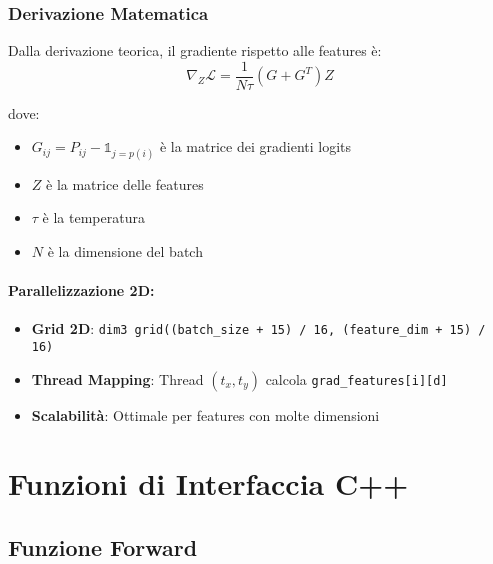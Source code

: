 \documentclass[a4paper,11pt]{article}
\begin{document}
\subsubsection{Derivazione Matematica}

Dalla derivazione teorica, il gradiente rispetto alle features è:
\begin{equation}
\nabla_Z \mathcal{L} = \frac{1}{N \tau} (G + G^T) Z
\end{equation}

dove:
\begin{itemize}
    \item $G_{ij} = P_{ij} - \mathbb{1}_{j=p(i)}$ è la matrice dei gradienti logits
    \item $Z$ è la matrice delle features
    \item $\tau$ è la temperatura
    \item $N$ è la dimensione del batch
\end{itemize}

\paragraph{Parallelizzazione 2D:}
\begin{itemize}
    \item \textbf{Grid 2D}: \texttt{dim3 grid((batch\_size + 15) / 16, (feature\_dim + 15) / 16)}
    \item \textbf{Thread Mapping}: Thread \((t_x, t_y)\) calcola \texttt{grad\_features[i][d]}
    \item \textbf{Scalabilità}: Ottimale per features con molte dimensioni
\end{itemize}

\section{Funzioni di Interfaccia C++}

\subsection{Funzione Forward}
\end{document}
